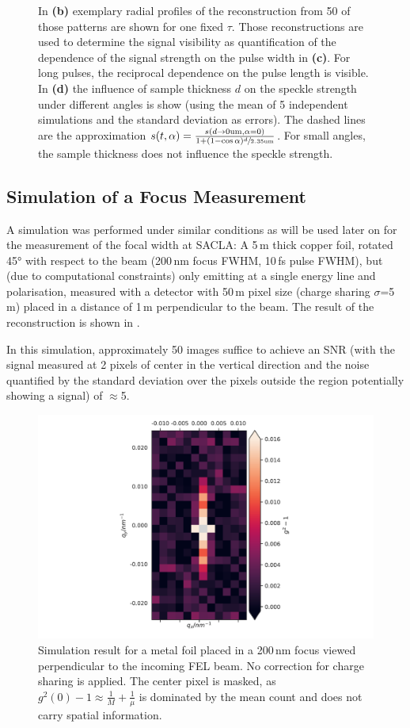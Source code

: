 \begin{figure}
{		In \textbf{(b)} exemplary radial profiles of the reconstruction from 50 of those patterns are shown for one fixed $\tau$. Those reconstructions are used to determine the signal visibility as quantification of the  dependence of the signal strength on the pulse width in \textbf{(c)}. For long pulses, the reciprocal dependence on the pulse length is visible.
		In \textbf{(d)}  the influence of sample thickness $d$ on the speckle strength under different angles is show (using the mean of 5 independent simulations and the standard deviation as errors). The dashed lines are the approximation $s(t,\alpha)=\frac{s(d\rightarrow0\text{um}, \alpha= 0)}{1+\left(1-\cos{\alpha}\right)\sfrac{d}{2.35\text{um}}}$. For small angles, the sample thickness does not influence the speckle strength.}
\end{figure}

\subsection{Simulation of a Focus Measurement}
A simulation was performed under similar conditions as will be used later on for the measurement of the focal width at SACLA:  A 5\,\textmu m thick copper foil, rotated 45° with respect to the beam (200\,nm focus FWHM, 10\,fs pulse FWHM), but (due to computational constraints) only emitting at a single energy line and polarisation, measured with a detector with 50\,\textmu m pixel size (charge sharing $\sigma$=5\,\textmu m) placed in a distance of 1\,m perpendicular to the beam. The result of the reconstruction is shown in . 

In this simulation, approximately 50 images suffice to achieve an SNR (with the signal measured at 2 pixels of center in the vertical direction and the noise quantified by the standard deviation over the pixels outside the region potentially showing a signal) of $\approx$5.
\vspace*{2cm}
\begin{figure}
	\centering
	\includegraphics[width=0.5\linewidth]{images/sim_foil5umCu_shared.pdf}
	\caption[Simulation of a metal foil with similar parameters as used in the experiment]{Simulation result for a metal foil placed in a 200\,nm focus viewed perpendicular to the incoming FEL beam. No correction for charge sharing is applied. The center pixel is masked, as $g^2(0)-1\approx 
		\frac{1}{M}+\frac{1}{\mu}$ is dominated by the mean count and does 
		not carry spatial information.}
	\label{fig:simfoil}
\end{figure}

